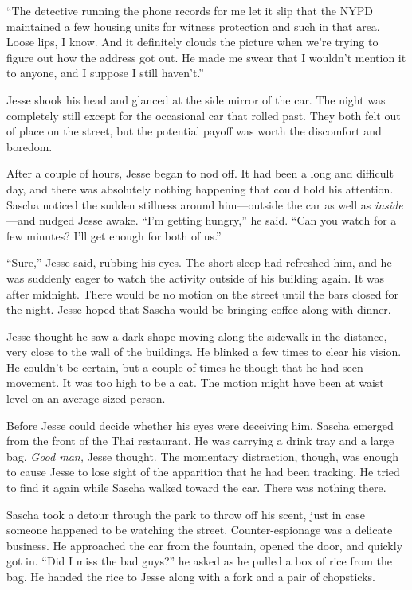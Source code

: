 \documentclass[12pt]{book}
\begin{document}
``The detective running the phone records for me let it slip that the NYPD maintained a few housing units for witness protection and such in that area.  Loose lips, I know.  And it definitely clouds the picture when we're trying to figure out how the address got out.  He made me swear that I wouldn't mention it to anyone, and I suppose I still haven't.''

Jesse shook his head and glanced at the side mirror of the car.  The night was completely still except for the occasional car that rolled past.  They both felt out of place on the street, but the potential payoff was worth the discomfort and boredom.

After a couple of hours, Jesse began to nod off.  It had been a long and difficult day, and there was absolutely nothing happening that could hold his attention.  Sascha noticed the sudden stillness around him---outside the car as well as \emph{inside}---and nudged Jesse awake.  ``I'm getting hungry,'' he said.  ``Can you watch for a few minutes?  I'll get enough for both of us.''

``Sure,'' Jesse said, rubbing his eyes.  The short sleep had refreshed him, and he was suddenly eager to watch the activity outside of his building again.  It was after midnight.  There would be no motion on the street until the bars closed for the night.  Jesse hoped that Sascha would be bringing coffee along with dinner.

Jesse thought he saw a dark shape moving along the sidewalk in the distance, very close to the wall of the buildings.  He blinked a few times to clear his vision.  He couldn't be certain, but a couple of times he though that he had seen movement.  It was too high to be a cat.  The motion might have been at waist level on an average-sized person.

Before Jesse could decide whether his eyes were deceiving him, Sascha emerged from the front of the Thai restaurant.  He was carrying a drink tray and a large bag.  \emph{Good man,} Jesse thought.  The momentary distraction, though, was enough to cause Jesse to lose sight of the apparition that he had been tracking.  He tried to find it again while Sascha walked toward the car.  There was nothing there.

Sascha took a detour through the park to throw off his scent, just in case someone happened to be watching the street.  Counter-espionage was a delicate business.  He approached the car from the fountain, opened the door, and quickly got in.  ``Did I miss the bad guys?'' he asked as he pulled a box of rice from the bag.  He handed the rice to Jesse along with a fork and a pair of chopsticks.
\end{document}

